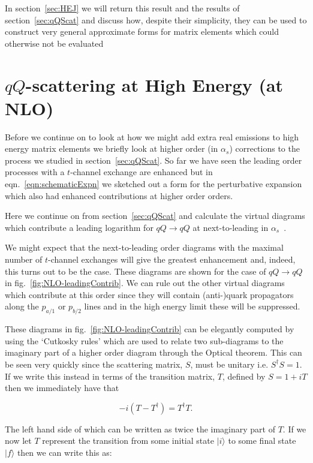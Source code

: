 		In section~\ref{sec:HEJ} we will return this result and the results of section~\ref{sec:qQScat} and discuss how,
		despite their simplicity, they can be used to construct very general approximate forms for matrix elements which
		could otherwise not be evaluated

\section{$qQ$-scattering at High Energy (at NLO)}
	\label{sub:HE22_NLO}

	Before we continue on to look at how we might add extra real emissions to high energy matrix
	elements we briefly look at higher order (in $\alpha_s$) corrections to the process we studied in
	section~\ref{sec:qQScat}.  So far we have seen the leading order processes with a $t$-channel
	exchange are enhanced but in eqn.~\eqref{eqn:schematicExpn} we sketched out a form for
	the perturbative expansion which also had enhanced contributions at higher order orders.

	Here we continue on from section~\ref{sec:qQScat} and calculate the virtual diagrams which contribute
	a leading logarithm for $qQ\to qQ$ at next-to-leading in $\alpha_s$~\cite{sabioThesis,DelDuca:1995hf}.

	We might expect that the next-to-leading order diagrams with the maximal number of $t$-channel exchanges
	will give the greatest enhancement and, indeed, this turns out to be the case.  These diagrams are shown
	for the case of $qQ\rightarrow qQ$ in fig.~\eqref{fig:NLO-leadingContrib}.  We can rule out the other
	virtual diagrams which contribute at this order since they will contain (anti-)quark propagators along
	the $p_{a/1}$ or $p_{b/2}$ lines and in the high energy limit these will be suppressed.

	These diagrams in fig.~\eqref{fig:NLO-leadingContrib} can be elegantly computed by using the `Cutkosky
	rules' which are used to relate two sub-diagrams to the imaginary part of a higher order diagram through
	the Optical theorem.  This can be seen very quickly since the scattering matrix, $S$, must be unitary i.e.
	$S^\dagger S=1$.  If we write this instead in terms of the transition matrix, $T$, defined by $S=1+iT$
	then we immediately have that

	\begin{equation}
		-i(T - T^\dagger) = T^\dagger T.
	\end{equation}

	The left hand side of which can be written as twice the imaginary part of $T$.  If we now let
	$T$ represent the transition from some initial state $|i\rangle$ to some final state
	$|f\rangle$ then we can write this as:

